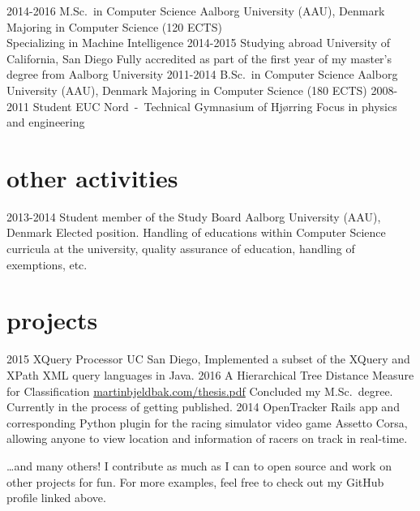 \documentclass{afriggeri-cv/friggeri-cv}
\newcommand{\aau}{%
  Aalborg University (AAU), Denmark
}
\begin{document}
\begin{entrylist}
  \entry
    {2014-2016}
    {M.Sc.\ {\normalfont in Computer Science}}
    {\aau}
    {Majoring in Computer Science (120 ECTS)\\
    Specializing in Machine Intelligence}
  \entry
    {2014-2015}
    {Studying abroad}
    {University of California, San Diego}
    {Fully accredited as part of the first year of my master's degree from Aalborg University}
  \entry
    {2011-2014}
    {B.Sc.\ {\normalfont in Computer Science}}
    {\aau}
    {Majoring in Computer Science (180 ECTS)}
  \entry
    {2008-2011}
    {Student}
    {EUC Nord~-~Technical Gymnasium of Hjørring}
    {Focus in physics and engineering}
\end{entrylist}

\section{other activities}
\begin{entrylist}
  \entry
    {2013-2014}
    {Student member of the Study Board}
    {\aau}
    {Elected position. Handling of educations within Computer Science curricula at the university, quality assurance of education, handling of exemptions, etc.}
\end{entrylist}

\section{projects}
\begin{entrylist}
  \entry
    {2015}
    {XQuery Processor}
    {UC San Diego, }
    {Implemented a subset of the XQuery and XPath XML query languages in Java.}
  \entry
    {2016}
    {A Hierarchical Tree Distance Measure for Classification}
    {\href{http://martinbjeldbak.com/thesis.pdf}{martinbjeldbak.com/thesis.pdf}}
    {Concluded my M.Sc.\ degree. Currently in the process of getting published.}
  \entry
    {2014}
    {OpenTracker}
    {}
    {Rails app and corresponding Python plugin for the racing simulator video game Assetto Corsa, allowing anyone to view location and information of racers on track in real-time.}
\end{entrylist}

\dots and many others! I contribute as much as I can to open source and work on other projects for fun. For more examples, feel free to check out my GitHub profile linked above.
\end{document}
